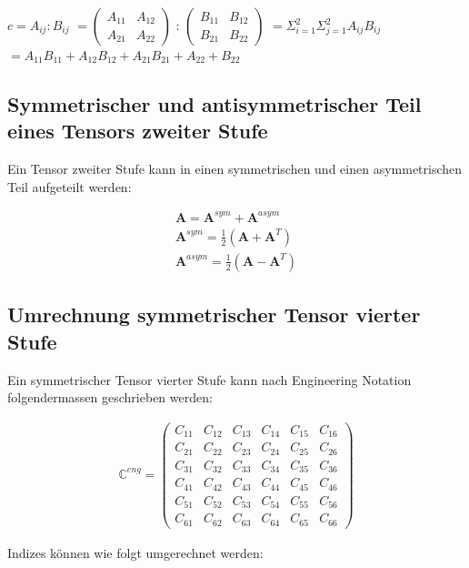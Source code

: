 \documentclass[a4paper, 10pt]{scrartcl}
\begin{document}
	
	$ 
	c = A_{ij}:B_{ij} 
	$
	$
	=
	\begin{pmatrix}
	A_{11} & A_{12} \\ 
	A_{21} & A_{22}
	\end{pmatrix} 
	$
	:
	$
	\begin{pmatrix}
	B_{11} & B_{12} \\ 
	B_{21} & B_{22}
	\end{pmatrix} 
	$
	$
	=\varSigma_{i=1}^{2}\varSigma_{j=1}^{2}A_{ij}B_{ij}
	$
	$
	=A_{11}B_{11}+A_{12}B_{12}+A_{21}B_{21}+A_{22}+B_{22}
	$
	\subsection{Symmetrischer und antisymmetrischer Teil eines Tensors zweiter
		Stufe}
	
	Ein Tensor zweiter Stufe kann in einen symmetrischen und einen asymmetrischen
	Teil aufgeteilt werden:
	
	\begin{align}
		\mathbf{A}=\mathbf{A}^{sym}+\mathbf{A}^{asym} \\
		\mathbf{A}^{sym}=\frac{1}{2}\left(\mathbf{A}+\mathbf{A}^T\right) \\
		\mathbf{A}^{asym}=\frac{1}{2}\left(\mathbf{A}-\mathbf{A}^T\right)
	\end{align}
	
	\subsection{Umrechnung symmetrischer Tensor vierter Stufe}\label{tensor4th}
	
	Ein symmetrischer Tensor vierter Stufe kann nach Engineering Notation
	folgendermassen geschrieben werden:
	
	\begin{align}
		\mathbb{C}^{eng}= \begin{pmatrix}
			C_{11}&C_{12}&C_{13}&C_{14}&C_{15}&C_{16}\\
			C_{21}&C_{22}&C_{23}&C_{24}&C_{25}&C_{26}\\
			C_{31}&C_{32}&C_{33}&C_{34}&C_{35}&C_{36}\\
			C_{41}&C_{42}&C_{43}&C_{44}&C_{45}&C_{46}\\
			C_{51}&C_{52}&C_{53}&C_{54}&C_{55}&C_{56}\\
			C_{61}&C_{62}&C_{63}&C_{64}&C_{65}&C_{66}
		\end{pmatrix}
	\end{align}
	
	Indizes können wie folgt umgerechnet werden:
	
\end{document}
